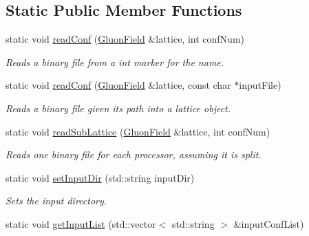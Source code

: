 \subsection*{Static Public Member Functions}
\begin{DoxyCompactItemize}
\item 
static void \hyperlink{classLatticeIO_1_1InputConf_a70d70bfdc0252ddaa3d2bcd472590982}{read\+Conf} (\hyperlink{classField}{Gluon\+Field} \&lattice, int conf\+Num)\hypertarget{classLatticeIO_1_1InputConf_a70d70bfdc0252ddaa3d2bcd472590982}{}\label{classLatticeIO_1_1InputConf_a70d70bfdc0252ddaa3d2bcd472590982}

\begin{DoxyCompactList}\small\item\em Reads a binary file from a int marker for the name. \end{DoxyCompactList}\item 
static void \hyperlink{classLatticeIO_1_1InputConf_aed71fc3df1e2a9999e4466b5eefdf723}{read\+Conf} (\hyperlink{classField}{Gluon\+Field} \&lattice, const char $\ast$input\+File)\hypertarget{classLatticeIO_1_1InputConf_aed71fc3df1e2a9999e4466b5eefdf723}{}\label{classLatticeIO_1_1InputConf_aed71fc3df1e2a9999e4466b5eefdf723}

\begin{DoxyCompactList}\small\item\em Reads a binary file given its path into a lattice object. \end{DoxyCompactList}\item 
static void \hyperlink{classLatticeIO_1_1InputConf_a0ea75c17916f8ce880d02a13b127cea8}{read\+Sub\+Lattice} (\hyperlink{classField}{Gluon\+Field} \&lattice, int conf\+Num)\hypertarget{classLatticeIO_1_1InputConf_a0ea75c17916f8ce880d02a13b127cea8}{}\label{classLatticeIO_1_1InputConf_a0ea75c17916f8ce880d02a13b127cea8}

\begin{DoxyCompactList}\small\item\em Reads one binary file for each processor, assuming it is split. \end{DoxyCompactList}\item 
static void \hyperlink{classLatticeIO_1_1InputConf_a49a84ce29fc32889d6c356c3afd09b71}{set\+Input\+Dir} (std\+::string input\+Dir)\hypertarget{classLatticeIO_1_1InputConf_a49a84ce29fc32889d6c356c3afd09b71}{}\label{classLatticeIO_1_1InputConf_a49a84ce29fc32889d6c356c3afd09b71}

\begin{DoxyCompactList}\small\item\em Sets the input directory. \end{DoxyCompactList}\item 
static void \hyperlink{classLatticeIO_1_1InputConf_a16b06fe98129e3c1e80879fa9cad43a9}{get\+Input\+List} (std\+::vector$<$ std\+::string $>$ \&input\+Conf\+List)\hypertarget{classLatticeIO_1_1InputConf_a16b06fe98129e3c1e80879fa9cad43a9}{}\label{classLatticeIO_1_1InputConf_a16b06fe98129e3c1e80879fa9cad43a9}


\end{DoxyCompactItemize}
